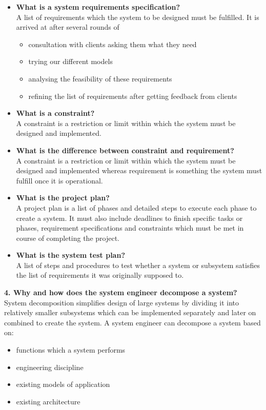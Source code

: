 \documentclass[12pt,letterpaper,titlepage,en-US]{article}
\begin{document}
  
  \begin{itemize}
\item \textbf{What is a system requirements specification?}\\
A list of requirements which the system to be designed must be fulfilled. It is arrived at after several rounds of 
\begin{itemize}
\item consultation with clients  asking them what they need
\item trying our different models
\item analysing the feasibility of these requirements
\item refining the list   of requirements after getting feedback from clients
\end{itemize}
        
        
        
        
        
  \item \textbf{What is a constraint? }\\
  A constraint is a restriction or limit within which the system must be designed and implemented.
  
  \item \textbf{ What is the difference between constraint and requirement?}\\
  A constraint is a restriction or limit within which the system must be designed and implemented whereas requirement is something the system must fulfill once it is operational.
        
        
        \item \textbf{What is the project plan?}\\
        A project plan is a list of phases and detailed steps to execute each phase to create a system. It must also include deadlines to finish specific tasks or phases, requirement specifications and constraints which must be met in course of completing the project.
        
       \item \textbf{What is the system test plan?}\\
       A list of steps and procedures to test whether a system or subsystem satisfies the list of requirements it was originally supposed to.
       
       \end{itemize}
        
    \textbf{4. Why and how does the system engineer decompose a system?}\\
    System decomposition simplifies design of large systems by dividing it into relatively smaller subsystems which can be implemented separately and later on combined to create the system. A system engineer can decompose a system based on:
    \begin{itemize}
    \item functions which a system performs
    \item engineering discipline
    \item existing models of application
    \item existing architecture
    \end{itemize}
    
\end{document}
